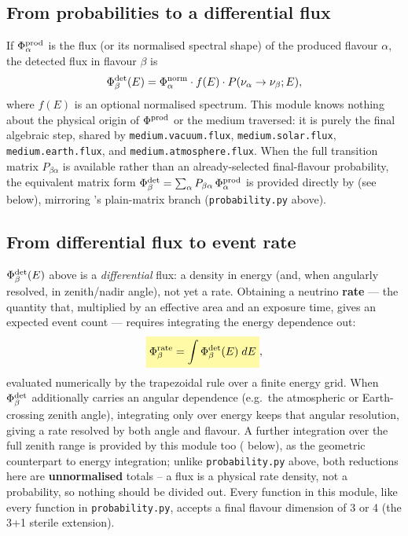 
\begin{theorybox}
\subsection*{From probabilities to a differential flux}
If $\Phi_\alpha^{\rm prod}$ is the flux (or its normalised spectral shape)
of the produced flavour $\alpha$, the detected flux in flavour $\beta$ is
\begin{equation}
  \Phi_\beta^{\rm det}(E) = \Phi_\alpha^{\rm norm}\cdot f(E)\cdot P(\nu_\alpha\to\nu_\beta; E),
\end{equation}
where $f(E)$ is an optional normalised spectrum. This module knows nothing
about the physical origin of $\Phi^{\rm prod}$ or the medium traversed: it
is purely the final algebraic step, shared by \texttt{medium.vacuum.flux},
\texttt{medium.solar.flux}, \texttt{medium.earth.flux}, and
\texttt{medium.atmosphere.flux}. When the full transition matrix
$P_{\beta\alpha}$ is available rather than an already-selected final-flavour
probability, the equivalent matrix form
$\Phi_\beta^{\rm det}=\sum_\alpha P_{\beta\alpha}\,\Phi_\alpha^{\rm prod}$
is provided directly by  (see below), mirroring
's plain-matrix branch
(\texttt{probability.py} above).

\subsection*{From differential flux to event rate}
$\Phi_\beta^{\rm det}(E)$ above is a \emph{differential} flux: a density in
energy (and, when angularly resolved, in zenith/nadir angle), not yet a
rate. Obtaining a neutrino \textbf{rate} --- the quantity that, multiplied
by an effective area and an exposure time, gives an expected event count
--- requires integrating the energy dependence out:
\begin{equation}
  \keyresult{\Phi_\beta^{\rm rate} = \int \Phi_\beta^{\rm det}(E)\;dE},
\end{equation}
evaluated numerically by the trapezoidal rule over a finite energy grid.
When $\Phi_\beta^{\rm det}$ additionally carries an angular dependence
(e.g.\ the atmospheric or Earth-crossing zenith angle), integrating only
over energy keeps that angular resolution, giving a rate resolved by both
angle and flavour. A further integration over the full zenith range is
provided by this module too ( below), as
the geometric counterpart to energy integration; unlike
\texttt{probability.py} above, both reductions here are \textbf{unnormalised}
totals -- a flux is a physical rate density, not a probability, so nothing
should be divided out. Every function in this module, like every function in
\texttt{probability.py}, accepts a final flavour dimension of 3 or 4 (the
3+1 sterile extension).
\end{theorybox}

